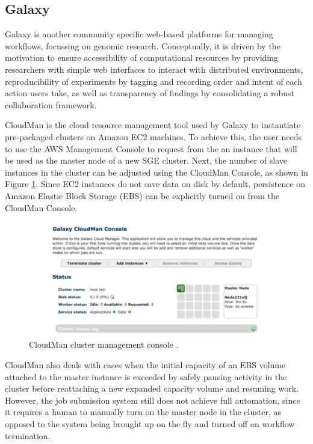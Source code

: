 \documentclass[11pt,a4paper]{report}
\begin{document}
\subsection{Galaxy}

Galaxy \cite{Goecks2010} is another community specific web-based platforms for managing workflows, focussing on genomic research. Conceptually, it is driven by the motivation to ensure accessibility of computational resources by providing researchers with simple web interfaces to interact with distributed environments, reproducibility of experiments by tagging and recording order and intent of each action users take, as well as transparency of findings by consolidating a robust collaboration framework.

CloudMan \cite{Afgan2010} is the cloud resource management tool used by Galaxy to instantiate pre-packaged clusters on Amazon EC2 machines. To achieve this, the user needs to use the AWS Management Console to request from the an instance that will be used as the master node of a new SGE cluster. Next, the number of slave instances in the cluster can be adjusted using the CloudMan Console, as shown in Figure \ref{CloudManConsole}. Since EC2 instances do not save data on disk by default, persistence on Amazon Elastic Block Storage (EBS) can be explicitly turned on from the CloudMan Console.

\begin{figure}[h]
	\centering
		\includegraphics[scale=0.40]{figures/CloudManConsole.png}
	\caption{CloudMan cluster management console \cite{Afgan2010}.}
	\label{CloudManConsole}
\end{figure}

CloudMan also deals with cases when the initial capacity of an EBS volume attached to the master instance is exceeded by safely pausing activity in the cluster before reattaching a new expanded capacity volume and resuming work. However, the job submission system still does not achieve full automation, since it requires a human to manually turn on the master node in the cluster, as opposed to the system being brought up on the fly and turned off on workflow termination.
\end{document}
